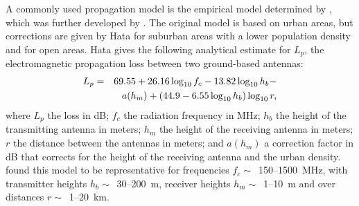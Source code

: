 \documentclass[useAMS,usenatbib]{mn2e}
\begin{document}
A commonly used propagation model is the empirical model determined by \citet{okumura-propagation-model}, which was further developed by \citet{hata-propagation-loss}. The original model is based on urban areas, but corrections are given by Hata for suburban areas with a lower population density and for open areas. Hata gives the following analytical estimate for $L_p$, the electromagnetic propagation loss between two ground-based antennas:
\begin{align} 
\notag                L_p & = & 69.55 + 26.16 \log_{10} f_c - 13.82 \log_{10} h_b - \\
\label{eq:hata-model} & &  a(h_m) + (44.9 - 6.55 \log_{10} h_b) \log_{10} r, 
\end{align}
where $L_p$ the loss in dB; $f_c$ the radiation frequency in MHz; $h_b$ the height of the transmitting antenna in meters; $h_m$ the height of the receiving antenna in meters; $r$ the distance between the antennas in meters; and $a(h_m)$ a correction factor in dB that corrects for the height of the receiving antenna and the urban density. \citeauthor{hata-propagation-loss} found this model to be representative for frequencies $f_c \sim$~150--1500~MHz, with transmitter heights $h_b \sim$~30--200~m, receiver heights $h_m \sim$~1--10~m and over distances $r\sim$~1--20~km.
\end{document}
